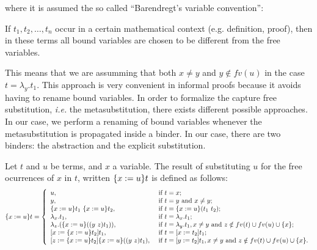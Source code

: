 \noindent where it is assumed the so called ``Barendregt's variable convention'':


\begin{tcolorbox}
 If $t_1, t_2, \ldots, t_n$ occur in a certain mathematical context (e.g. definition, proof), then in these terms all bound variables are chosen to be different from the free variables.  
\end{tcolorbox}


This means that we are assumming that both $x \neq y$ and $y\notin fv(u)$ in the case $t = \lambda_y.t_1$. This approach is very convenient in informal proofs because it avoids having to rename bound variables. In order to formalize the capture free substitution, {\it i.e.} the metasubstitution, there exists different possible approaches. In our case, we perform a renaming of bound variables whenever the metasubstitution is propagated inside a binder. In our case, there are two binders: the abstraction and the explicit substitution.


Let $t$ and $u$ be terms, and $x$ a variable. The result of substituting $u$ for the free ocurrences of $x$ in $t$, written $\metasub{t}{x}{u}$ is defined as follows:\newline
\begin{equation}\label{msubst}
\metasub{t}{x}{u} = \left\{
 \begin{array}{ll}
  u, & \mbox{ if } t = x; \\
  y, & \mbox{ if } t = y \mbox{ and } x \neq y; \\
  \metasub{t_1}{x}{u}\ \metasub{t_2}{x}{u}, & \mbox{ if } t = \metasub{(t_1\ t_2)}{x}{u}; \\
  \lambda_x.t_1, & \mbox{ if } t = \lambda_x.t_1; \\
  \lambda_z.(\metasub{(\swap{y}{z}{t_1})}{x}{u}), & \mbox{ if } t = \lambda_y.t_1, x \neq y \mbox{ and } z\notin fv(t)\cup fv(u) \cup \{x\}; \\
  \esub{t_1}{x}{\metasub{t_2}{x}{u}}, & \mbox{ if } t = \esub{t_1}{x}{t_2}; \\
  \esub{\metasub{(\swap{y}{z}{t_1})}{x}{u}}{z}{\metasub{t_2}{x}{u}}, & \mbox{ if } t = \esub{t_1}{y}{t_2}, x \neq y \mbox{ and } z\notin fv(t)\cup fv(u) \cup \{x\}.
 \end{array}\right.
\end{equation}


